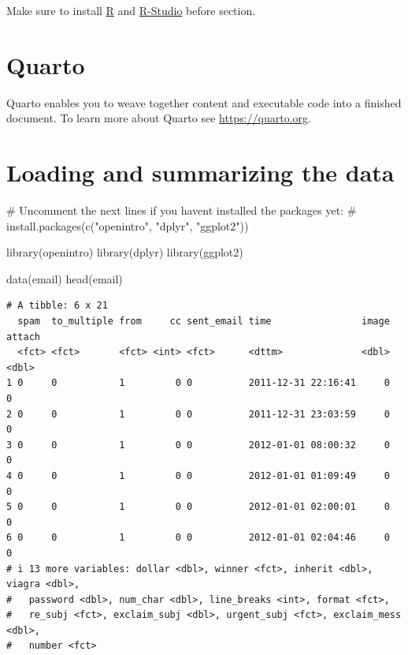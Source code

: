 \documentclass[
  letterpaper,
  DIV=11,
  numbers=noendperiod]{scrreprt}
\newenvironment{Shaded}{\begin{snugshade}}{\end{snugshade}}
\newcommand{\CommentTok}[1]{\textcolor[rgb]{0.37,0.37,0.37}{#1}}
\newcommand{\FunctionTok}[1]{\textcolor[rgb]{0.28,0.35,0.67}{#1}}
\newcommand{\NormalTok}[1]{\textcolor[rgb]{0.00,0.23,0.31}{#1}}
\begin{document}
Make sure to install
\href{https://rstudio-education.github.io/hopr/starting.html}{R} and
\href{https://posit.co/download/rstudio-desktop/}{R-Studio} before
section.

\section{Quarto}\label{quarto}

Quarto enables you to weave together content and executable code into a
finished document. To learn more about Quarto see
\url{https://quarto.org}.

\section{Loading and summarizing the
data}\label{loading-and-summarizing-the-data}

\begin{Shaded}
\begin{Highlighting}[]
\CommentTok{\# Uncomment the next lines if you haven\textquotesingle{}t installed the packages yet:}
\CommentTok{\# install.packages(c("openintro", "dplyr", "ggplot2"))}

\FunctionTok{library}\NormalTok{(openintro)}
\FunctionTok{library}\NormalTok{(dplyr)}
\FunctionTok{library}\NormalTok{(ggplot2)}

\FunctionTok{data}\NormalTok{(email)}
\FunctionTok{head}\NormalTok{(email)}
\end{Highlighting}
\end{Shaded}

\begin{verbatim}
# A tibble: 6 x 21
  spam  to_multiple from     cc sent_email time                image attach
  <fct> <fct>       <fct> <int> <fct>      <dttm>              <dbl>  <dbl>
1 0     0           1         0 0          2011-12-31 22:16:41     0      0
2 0     0           1         0 0          2011-12-31 23:03:59     0      0
3 0     0           1         0 0          2012-01-01 08:00:32     0      0
4 0     0           1         0 0          2012-01-01 01:09:49     0      0
5 0     0           1         0 0          2012-01-01 02:00:01     0      0
6 0     0           1         0 0          2012-01-01 02:04:46     0      0
# i 13 more variables: dollar <dbl>, winner <fct>, inherit <dbl>, viagra <dbl>,
#   password <dbl>, num_char <dbl>, line_breaks <int>, format <fct>,
#   re_subj <fct>, exclaim_subj <dbl>, urgent_subj <fct>, exclaim_mess <dbl>,
#   number <fct>
\end{verbatim}
\end{document}
